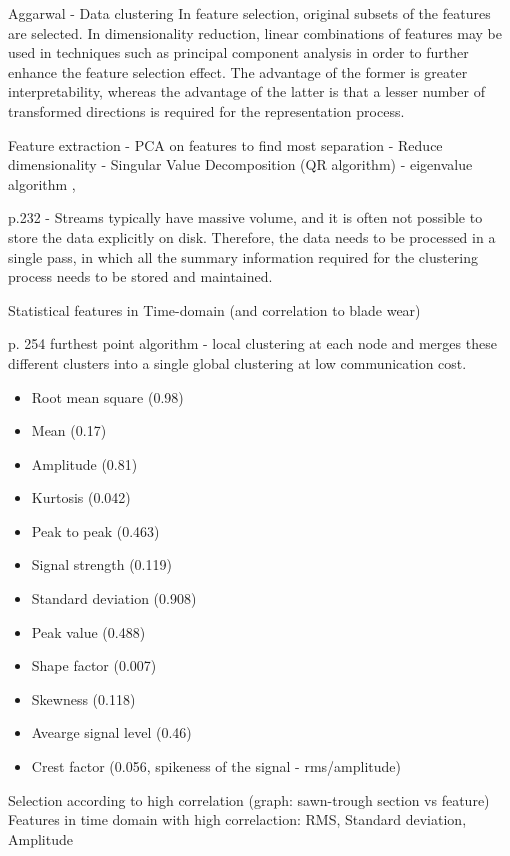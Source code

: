 Aggarwal - Data clustering
In feature selection, original subsets of the features are selected. In dimensionality reduction, linear combinations of features may be used in techniques such as principal component analysis in order to further enhance the feature selection effect. The advantage of the former is greater interpretability, whereas the advantage of the latter is that a lesser number of transformed directions is required for the representation process.

Feature extraction - PCA on features to find most separation 
	- Reduce dimensionality 
	- Singular Value Decomposition (QR algorithm) - eigenvalue algorithm , 


p.232 - Streams typically have massive volume, and it is often not possible to store the data explicitly on disk. Therefore, the data needs to be processed in a single pass, in which all the summary information required for the clustering process needs to be stored and maintained.

Statistical features in Time-domain (and correlation to blade wear) \cite{zhuo_research_2022} \cite{zheng_feature_2018}

p. 254 furthest point algorithm - local clustering at each node and merges these different clusters into a single global clustering at low communication cost.

\begin{itemize}
	\item 	Root mean square (0.98)
	\item Mean (0.17)
	\item Amplitude (0.81)
	\item Kurtosis (0.042)
	\item Peak to peak (0.463)
	\item Signal strength (0.119)
	\item Standard deviation (0.908)
	\item Peak value (0.488)
	\item Shape factor (0.007)
	\item Skewness (0.118)
	\item Avearge signal level (0.46)
	\item Crest factor (0.056, spikeness of the signal - rms/amplitude)
\end{itemize}
Selection according to high correlation (graph: sawn-trough section vs feature)
Features in time domain with high correlaction: RMS, Standard deviation, Amplitude


